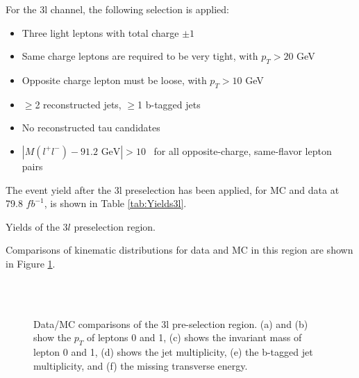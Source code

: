 For the 3l channel, the following selection is applied:

\begin{itemize}
  \item Three light leptons with total charge $\pm 1$
  \item Same charge leptons are required to be very tight, with $p_T > 20$ GeV
  \item Opposite charge lepton must be loose, with $p_T > 10$ GeV
  \item $\geq$2 reconstructed jets, $\geq$1 b-tagged jets                                              
  \item No reconstructed tau candidates
  \item $|M(l^+l^-)-91.2\textrm{ GeV}| > 10$~\GeV{} for all opposite-charge, same-flavor lepton pairs
\end{itemize}

The event yield after the 3l preselection has been applied, for MC and data at 79.8 $fb^{-1}$, is shown in Table \ref{tab:Yields3l}.

\begin{table}[H]

\label{tab:Yields3l}
\caption{Yields of the $3l$ preselection region.}
\end{table}

Comparisons of kinematic distributions for data and MC in this region are shown in Figure \ref{fig:presel3l}.

\begin{figure}[H]
    \centering
    \\                             
    \\                         
    \caption{Data/MC comparisons of the 3l pre-selection region. (a) and (b) show the $p_T$ of leptons 0 and 1, (c) shows the invariant mass of lepton 0 and 1, (d) shows the jet multiplicity, (e) the b-tagged jet multiplicity, and (f) the missing transverse energy.}
    \label{fig:presel3l}                                                                                          
\end{figure}

